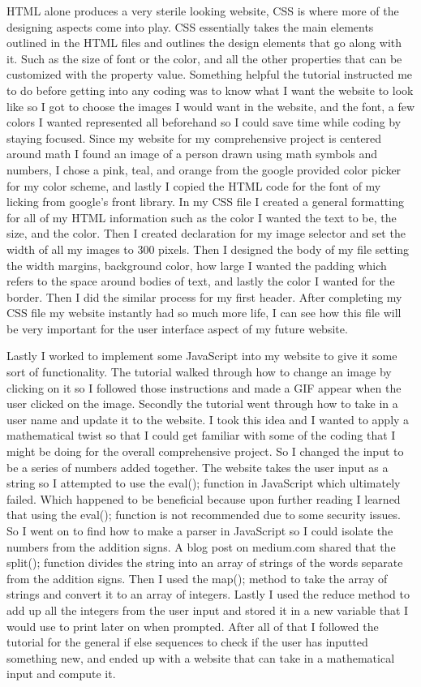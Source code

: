 \documentclass[10pt,twocolumn]{article}
\begin{document}
HTML alone produces a very sterile looking website, CSS is where more of the designing aspects come into play. CSS essentially takes the main elements outlined in the HTML files and outlines the design elements that go along with it. Such as the size of font or the color, and all the other properties that can be customized with the property value. Something helpful the tutorial instructed me to do before getting into any coding was to know what I want the website to look like so I got to choose the images I would want in the website, and the font, a few colors I wanted represented all beforehand so I could save time while coding by staying focused. Since my website for my comprehensive project is centered around math I found an image of a person drawn using math symbols and numbers, I chose a pink, teal, and orange from the google provided color picker for my color scheme, and lastly I copied the HTML code for the font of my licking from google's front library. In my CSS file I created a general formatting for all of my HTML information such as the color I wanted the text to be, the size, and the color. Then I created declaration for my image selector and set the width of all my images to 300 pixels. Then I designed the body of my file setting the width margins, background color, how large I wanted the padding which refers to the space around bodies of text, and lastly the color I wanted for the border. Then I did the similar process for my first header. After completing my CSS file my website instantly had so much more life, I can see how this file will be very important for the user interface aspect of my future website. 

Lastly I worked to implement some JavaScript into my website to give it some sort of functionality. The tutorial walked through how to change an image by clicking on it so I followed those instructions and made a GIF appear when the user clicked on the image. Secondly the tutorial went through how to take in a user name and update it to the website. I took this idea and I wanted to apply a mathematical twist so that I could get familiar with some of the coding that I might be doing for the overall comprehensive project. So I changed the input to be a series of numbers added together. The website takes the user input as a string so I attempted to use the eval(); function in JavaScript which ultimately failed. Which happened to be beneficial because upon further reading I learned that using the eval(); function is not recommended due to some security issues. So I went on to find how to make a parser in JavaScript so I could isolate the numbers from the addition signs. A blog post on medium.com shared that the split(); function divides the string into an array of strings of the words separate from the addition signs. Then I used the map(); method to take the array of strings and convert it to an array of integers. Lastly I used the reduce method to add up all the integers from the user input and stored it in a new variable that I would use to print later on when prompted. After all of that I followed the tutorial for the general if else sequences to check if the user has inputted something new, and ended up with a website that can take in a mathematical input and compute it. 
\end{document}
